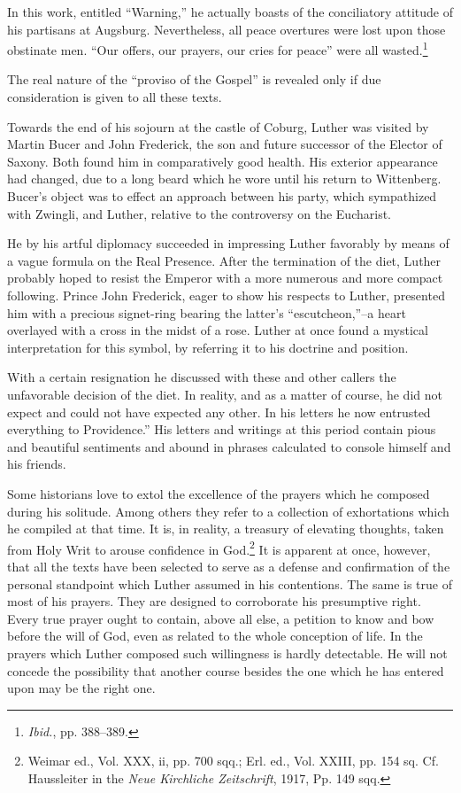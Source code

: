 In this work, entitled “Warning,”
he actually boasts of the conciliatory attitude of his partisans at Augsburg.
Nevertheless, all peace overtures were lost upon those obstinate
men. “Our offers, our prayers, our cries for peace” were all wasted.\footnote{\textit{Ibid.}, pp. 388--389.}


The real nature of the “proviso of the Gospel” is revealed only if
due consideration is given to all these texts.

Towards the end of his sojourn at the castle of Coburg, Luther was
visited by Martin Bucer and John Frederick, the son and future
successor of the Elector of Saxony. Both found him in comparatively
good health. His exterior appearance had changed, due to a long
beard which he wore until his return to Wittenberg. Bucer’s object
was to effect an approach between his party, which sympathized with
Zwingli, and Luther, relative to the controversy on the Eucharist.

He by his artful diplomacy succeeded in impressing Luther
favorably by means of a vague formula on the Real Presence. After
the termination of the diet, Luther probably hoped to resist the Emperor
with a more numerous and more compact following. Prince
John Frederick, eager to show his respects to Luther, presented him
with a precious signet-ring bearing the latter’s “escutcheon,”--a
heart overlayed with a cross in the midst of a rose. Luther at once
found a mystical interpretation for this symbol, by referring it to
his doctrine and position.

With a certain resignation he discussed with these and other callers
the unfavorable decision of the diet. In reality, and as a matter of
course, he did not expect and could not have expected any other.
In his letters he now entrusted everything to Providence.”
His letters and writings at this period contain pious and beautiful sentiments
and abound in phrases calculated to console himself and his friends.

Some historians love to extol the excellence of the prayers which he
composed during his solitude. Among others they refer to a collection
of exhortations which he compiled at that time. It is, in reality, a
treasury of elevating thoughts, taken from Holy Writ to arouse confidence
in God.\footnote
{Weimar ed., Vol. XXX, ii, pp. 700 sqq.; Erl. ed., Vol. XXIII, pp. 154 sq. Cf. Haussleiter
in the \textit{Neue Kirchliche Zeitschrift}, 1917, Pp. 149 sqq.}
It is apparent at once, however, that all the texts
have been selected to serve as a defense and confirmation of the personal
standpoint which Luther assumed in his contentions. The same
is true of most of his prayers. They are designed to corroborate his
presumptive right. Every true prayer ought to contain, above all
else, a petition to know and bow before the will of God, even as related
to the whole conception of life. In the prayers which Luther
composed such willingness is hardly detectable. He will not concede
the possibility that another course besides the one which he has entered
upon may be the right one.

